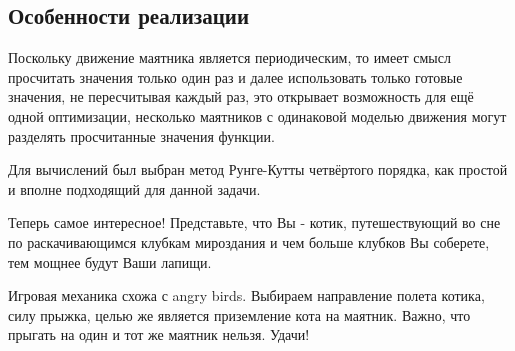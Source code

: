 \documentclass[a4paper,12pt]{article}
\begin{document}
\subsection{Особенности реализации}

Поскольку движение маятника является периодическим, то имеет смысл просчитать значения только один раз и далее использовать только готовые значения, не пересчитывая каждый раз, это открывает возможность для ещё одной оптимизации, несколько маятников с одинаковой моделью движения могут разделять просчитанные значения функции.

Для вычислений был выбран метод Рунге-Кутты четвёртого порядка, как простой и вполне подходящий для данной задачи.

Теперь самое интересное! Представьте, что Вы - котик, путешествующий во сне по раскачивающимся клубкам мироздания и чем больше клубков Вы соберете, тем мощнее будут Ваши лапищи.

Игровая механика схожа с angry birds. Выбираем направление полета котика, силу прыжка, целью же является приземление кота на маятник. Важно, что прыгать на один и тот же маятник нельзя. Удачи!
\end{document}
